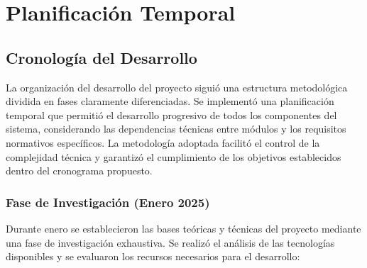 \chapter{Planificación Temporal}\label{ch:temporal_scheduling}

\section{Cronología del Desarrollo}

La organización del desarrollo del proyecto siguió una estructura metodológica dividida en fases claramente diferenciadas. Se implementó una planificación temporal que permitió el desarrollo progresivo de todos los componentes del sistema, considerando las dependencias técnicas entre módulos y los requisitos normativos específicos. La metodología adoptada facilitó el control de la complejidad técnica y garantizó el cumplimiento de los objetivos establecidos dentro del cronograma propuesto.

\subsection{Fase de Investigación (Enero 2025)}

Durante enero se establecieron las bases teóricas y técnicas del proyecto mediante una fase de investigación exhaustiva. Se realizó el análisis de las tecnologías disponibles y se evaluaron los recursos necesarios para el desarrollo:

